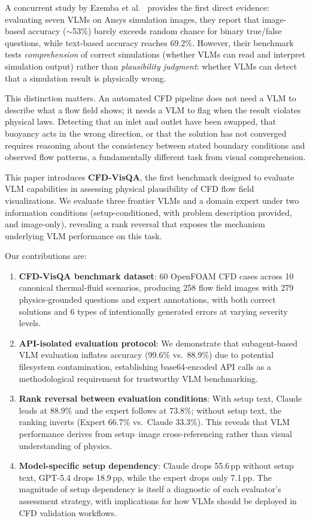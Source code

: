 \documentclass[preprint,12pt]{elsarticle}
\begin{document}
A concurrent study by Ezemba et al.\ \cite{ezemba.etal2025SimulationVs} provides the first
direct evidence: evaluating seven VLMs on Ansys simulation images, they report that
image-based accuracy ($\sim$53\%) barely exceeds random chance for binary
true/false questions, while text-based accuracy reaches 69.2\%. However, their
benchmark tests \emph{comprehension} of correct simulations (whether VLMs can read
and interpret simulation output) rather than \emph{plausibility judgment}: whether
VLMs can detect that a simulation result is physically wrong.

This distinction matters. An automated CFD pipeline does not need a VLM to describe
what a flow field shows; it needs a VLM to flag when the result violates physical
laws. Detecting that an inlet and outlet have been swapped, that buoyancy acts in
the wrong direction, or that the solution has not converged requires reasoning about
the consistency between stated boundary conditions and observed flow patterns, a
fundamentally different task from visual comprehension.

This paper introduces \textbf{CFD-VisQA}, the first benchmark designed to evaluate
VLM capabilities in assessing physical plausibility of CFD flow field
visualizations. We evaluate three frontier VLMs and a domain expert under two
information conditions (setup-conditioned, with problem description provided, and
image-only), revealing a rank reversal that exposes the mechanism
underlying VLM performance on this task.

Our contributions are:
\begin{enumerate}
\item \textbf{CFD-VisQA benchmark dataset}: 60 OpenFOAM CFD cases across 10
  canonical thermal-fluid scenarios, producing 258 flow field images with 279
  physics-grounded questions and expert annotations, with both correct solutions and
  6 types of intentionally generated errors at varying severity levels.

\item \textbf{API-isolated evaluation protocol}: We demonstrate that subagent-based
  VLM evaluation inflates accuracy (99.6\% vs.\ 88.9\%) due to potential filesystem
  contamination, establishing base64-encoded API calls as a methodological
  requirement for trustworthy VLM benchmarking.

\item \textbf{Rank reversal between evaluation conditions}: With setup text, Claude
  leads at 88.9\% and the expert follows at 73.8\%; without setup text, the ranking
  inverts (Expert 66.7\% vs.\ Claude 33.3\%). This reveals that VLM performance
  derives from setup--image cross-referencing rather than visual understanding of
  physics.

\item \textbf{Model-specific setup dependency}: Claude drops 55.6\,pp without setup
  text, GPT-5.4 drops 18.9\,pp, while the expert drops only 7.1\,pp. The magnitude
  of setup dependency is itself a diagnostic of each evaluator's assessment
  strategy, with implications for how VLMs should be deployed in CFD validation
  workflows.
\end{enumerate}
\end{document}
